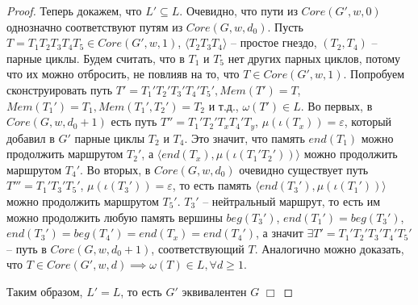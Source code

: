 \begin{proof}
    Теперь докажем, что $L' \subseteq L$. 
    Очевидно, что пути из $Core(G', w, 0)$ однозначно соответствуют путям из $Core(G, w, d_0)$. 
    Пусть $T = T_1 T_2 T_3 T_4 T_5 \in Core(G', w, 1)$, 
    $\langle T_2 T_3 T_4 \rangle$ -- простое гнездо, $(T_2, T_4)$ -- парные циклы.
    Будем считать, что в $T_1$ и $T_5$ нет других парных циклов,
    потому что их можно отбросить, не повлияв на то, что $T \in Core(G',w,1)$. 
    Попробуем сконструировать путь $T' = T_1' T_2' T_3' T_4' T_5', Mem(T') = T$, 
    $Mem(T_1') = T_1, Mem(T_1', T_2') = T_2$ и т.д., $\omega(T') \in L$.
    Во первых, в $Core(G, w, d_0 + 1)$ есть путь $T'' = T_1' T_2' T_x T_4' T_y$, $\mu(\iota(T_x)) = \varepsilon$, 
    который добавил в $G'$ парные циклы $T_2$ и $T_4$.
    Это значит, что память $end(T_1)$ можно продолжить маршрутом $T_2'$, 
    а $\langle end(T_x), \mu(\iota(T_1' T_2')) \rangle$ можно продолжить маршрутом $T_4'$.
    Во вторых, в $Core(G, w, d_0)$ очевидно существует путь $T''' = T_1' T_3' T_5'$, $\mu(\iota(T_3')) = \varepsilon$, 
    то есть память $\langle end(T_3'), \mu(\iota(T_1')) \rangle$ можно продолжить маршрутом  $T_5'$. 
    $T_3'$ -- нейтральный маршрут, то есть им можно продолжить любую память вершины $beg(T_3')$, 
    $end(T_1') = beg(T_3')$, $end(T_3') = beg(T_4') = end(T_x) = end(T_4')$, а значит 
    $\exists T' = T_1' T_2' T_3' T_4' T_5'$ -- путь в $Core(G, w, d_0 + 1)$, 
    соответствующий $T$. Аналогично можно доказать, что $T \in Core(G', w, d) \implies \omega(T) \in L, \forall d \geq 1$.

    Таким образом, $L' = L$, то есть $G'$ эквивалентен $G$ $\Box$ 
    

\end{proof}

\clearpage
